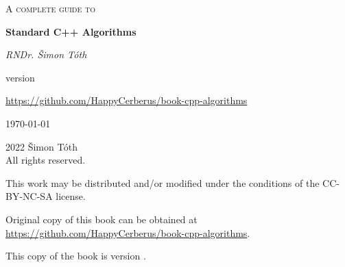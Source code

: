 \begin{titlepage}
	\centering
	\vspace{2cm}
	{\scshape\huge A complete guide to\par}
	\vspace{1.5cm}
	{\huge\bfseries Standard C++ Algorithms\par}
	\vspace{2cm}
	{\Large\itshape RNDr. Šimon Tóth\par}
	\vfill
	version \version\par
	\href{https://github.com/HappyCerberus/book-cpp-algorithms}{https://github.com/HappyCerberus/book-cpp-algorithms}

	\vfill

	{\large \today\par}
\end{titlepage}

\pagestyle{empty}
\begingroup
\footnotesize
\parindent 0pt
\parskip \baselineskip
\vfill
\textcopyright{} 2022 Šimon Tóth \\
All rights reserved.

This work may be distributed and/or modified under the conditions of the CC-BY-NC-SA license.

Original copy of this book can be obtained at \href{https://github.com/HappyCerberus/book-cpp-algorithms}{https://github.com/HappyCerberus/book-cpp-algorithms}.

This copy of the book is version \version.

\vfill

\vspace*{2\baselineskip}


\endgroup
\clearpage